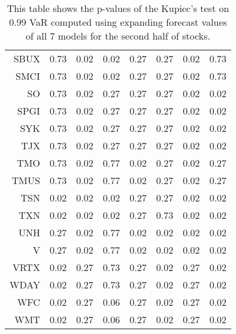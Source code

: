 \begin{table}[ht]
\begin{tabular}{rrrrrrrr}
  SBUX & 0.73 & 0.02 & 0.02 & 0.27 & 0.27 & 0.02 & 0.73 \\ 
  SMCI & 0.73 & 0.02 & 0.02 & 0.27 & 0.27 & 0.02 & 0.73 \\ 
  SO & 0.73 & 0.02 & 0.27 & 0.27 & 0.27 & 0.02 & 0.02 \\ 
  SPGI & 0.73 & 0.02 & 0.27 & 0.27 & 0.27 & 0.02 & 0.02 \\ 
  SYK & 0.73 & 0.02 & 0.27 & 0.27 & 0.27 & 0.02 & 0.02 \\ 
  TJX & 0.73 & 0.02 & 0.27 & 0.27 & 0.27 & 0.02 & 0.02 \\ 
  TMO & 0.73 & 0.02 & 0.77 & 0.02 & 0.27 & 0.02 & 0.27 \\ 
  TMUS & 0.73 & 0.02 & 0.77 & 0.02 & 0.27 & 0.02 & 0.27 \\ 
  TSN & 0.02 & 0.02 & 0.02 & 0.27 & 0.27 & 0.02 & 0.02 \\ 
  TXN & 0.02 & 0.02 & 0.02 & 0.27 & 0.73 & 0.02 & 0.02 \\ 
  UNH & 0.27 & 0.02 & 0.77 & 0.02 & 0.02 & 0.02 & 0.02 \\ 
  V & 0.27 & 0.02 & 0.77 & 0.02 & 0.02 & 0.02 & 0.02 \\ 
  VRTX & 0.02 & 0.27 & 0.73 & 0.27 & 0.02 & 0.27 & 0.02 \\ 
  WDAY & 0.02 & 0.27 & 0.73 & 0.27 & 0.02 & 0.27 & 0.02 \\ 
  WFC & 0.02 & 0.27 & 0.06 & 0.27 & 0.02 & 0.27 & 0.02 \\ 
  WMT & 0.02 & 0.27 & 0.06 & 0.27 & 0.02 & 0.27 & 0.02 \\ 
   \hline
\end{tabular}
\caption[Kupiec's test p-values, alpha =0.99 (2)]{This table shows the p-values of the Kupiec's test on 0.99 VaR computed using expanding forecast values of all 7 models for the second half of stocks.} 
\label{Table:Kupiec_test_expanding_0.99_2}
\end{table}
